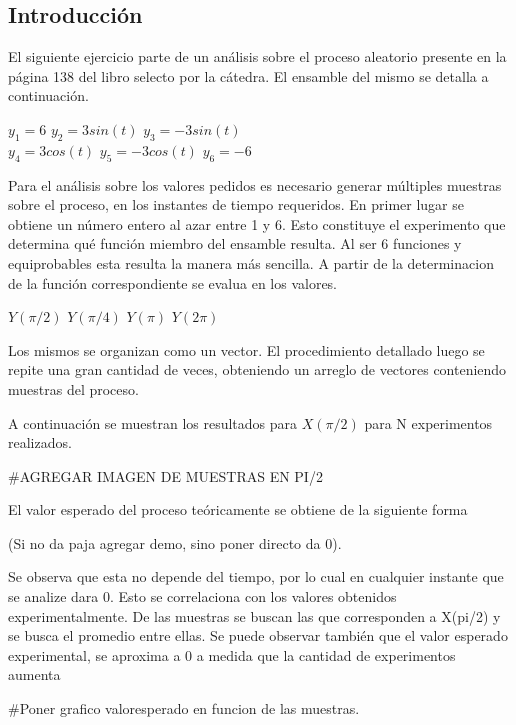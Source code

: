 



\subsection{Introducción}

El siguiente ejercicio parte de un análisis sobre el proceso aleatorio presente en la página 138 del libro selecto por la cátedra. El ensamble del mismo se detalla a continuación.

\begin{center}
    $y_{1} = 6$ $y_{2} = 3sin(t)$  $y_{3} = -3sin(t)$ \\
    $y_{4} = 3cos(t)$ $y_{5} = -3cos(t)$  $y_{6} = -6$
\end{center}

Para el análisis sobre los valores pedidos es necesario generar múltiples muestras sobre el proceso, en los instantes de tiempo requeridos. En primer lugar se obtiene un número entero al azar entre 1 y 6. Esto constituye el experimento que determina qué función miembro del ensamble resulta. Al ser 6 funciones y equiprobables esta resulta la manera más sencilla. A partir de la determinacion de la función correspondiente se evalua en los valores.

\begin{center}
    $Y(\pi/2)$ $Y(\pi/4)$ $Y(\pi)$ $Y(2\pi)$
\end{center}


Los mismos se organizan como un vector. El procedimiento detallado luego se repite una gran cantidad de veces, obteniendo un arreglo de vectores conteniendo muestras del proceso.

A continuación se muestran los resultados para $X(\pi/2)$ para N experimentos realizados.

#AGREGAR IMAGEN DE MUESTRAS EN PI/2

El valor esperado del proceso teóricamente se obtiene de la siguiente forma


(Si no da paja agregar demo, sino poner directo da 0).

Se observa que esta no depende del tiempo, por lo cual en cualquier instante que se analize dara 0. Esto se correlaciona con los valores obtenidos experimentalmente. De las muestras se buscan las que corresponden a X(pi/2) y se busca el promedio entre ellas. Se puede observar también que el valor esperado experimental, se aproxima a 0 a medida que la cantidad de experimentos aumenta

#Poner grafico valoresperado en funcion de las muestras.






